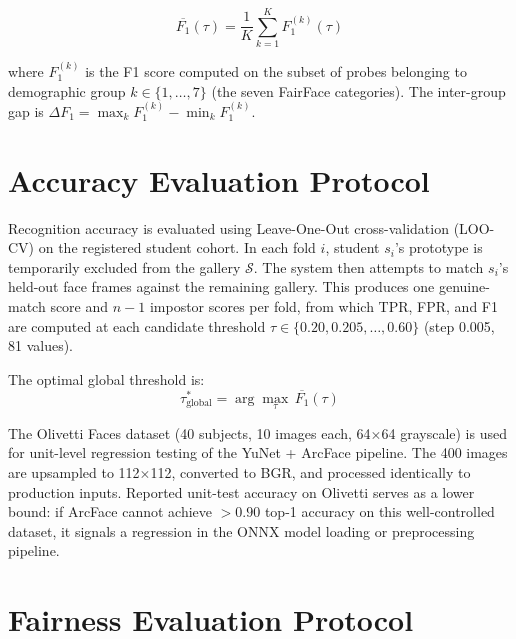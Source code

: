 \documentclass[12pt,a4paper]{report}
\begin{document}
\begin{equation}
  \overline{F_1}(\tau) = \frac{1}{K} \sum_{k=1}^{K} F_1^{(k)}(\tau) \label{eq:macro-f1}
\end{equation}

where $F_1^{(k)}$ is the F1 score computed on the subset of probes belonging to demographic group $k \in \{1, \ldots, 7\}$ (the seven FairFace categories). The inter-group gap is $\Delta F_1 = \max_k F_1^{(k)} - \min_k F_1^{(k)}$.

\section{Accuracy Evaluation Protocol}
\label{sec:eval-accuracy}

Recognition accuracy is evaluated using Leave-One-Out cross-validation (LOO-CV) on the registered student cohort. In each fold $i$, student $s_i$'s prototype is temporarily excluded from the gallery $\mathcal{S}$. The system then attempts to match $s_i$'s held-out face frames against the remaining gallery. This produces one genuine-match score and $n-1$ impostor scores per fold, from which TPR, FPR, and F1 are computed at each candidate threshold $\tau \in \{0.20, 0.205, \ldots, 0.60\}$ (step 0.005, 81 values).

The optimal global threshold is:
\begin{equation}
  \tau^*_{\text{global}} = \arg\max_{\tau} \, \overline{F_1}(\tau)
\end{equation}

The Olivetti Faces dataset \cite{samaria1994parameterisation} (40 subjects, 10 images each, 64$\times$64 grayscale) is used for unit-level regression testing of the YuNet + ArcFace pipeline. The 400 images are upsampled to 112$\times$112, converted to BGR, and processed identically to production inputs. Reported unit-test accuracy on Olivetti serves as a lower bound: if ArcFace cannot achieve $>0.90$ top-1 accuracy on this well-controlled dataset, it signals a regression in the ONNX model loading or preprocessing pipeline.

\section{Fairness Evaluation Protocol}
\label{sec:eval-fairness-protocol}
\end{document}
